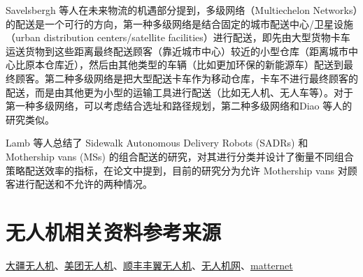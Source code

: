 \documentclass[fontset=none]{ctexart}
\begin{document}
Savelsbergh 等人\cite{savelsbergh50thAnniversaryInvited2016}在未来物流的机遇部分提到，多级网络（Multiechelon Networks）的配送是一个可行的方向，第一种多级网络是结合固定的城市配送中心/卫星设施（urban distribution centers/satellite facilities）进行配送，即先由大型货物卡车运送货物到这些距离最终配送顾客（靠近城市中心）较近的小型仓库（距离城市中心比原本仓库近），然后由其他类型的车辆（比如更加环保的新能源车）配送到最终顾客。第二种多级网络是把大型配送卡车作为移动仓库，卡车不进行最终顾客的配送，而是由其他更为小型的运输工具进行配送（比如无人机、无人车等）。对于第一种多级网络，可以考虑结合选址和路径规划，第二种多级网络和Diao 等人\cite{diaoMultidepotRoutingProblem2024}的研究类似。

Lamb 等人\cite{lambPlanningOptimisedLocal2025}总结了 Sidewalk Autonomous Delivery Robots (SADRs) 和 Mothership vans (MSs) 的组合配送的研究，对其进行分类并设计了衡量不同组合策略配送效率的指标，在论文中提到，目前的研究分为允许 Mothership vans 对顾客进行配送和不允许的两种情况。



\appendix

\section{无人机相关资料参考来源}

\href{https://www.dji.com/cn/flycart-30}{大疆无人机}、\href{https://www.meituan.com/news/NN25032008100109X}{美团无人机}、\href{https://www.fyuav.cn/}{顺丰丰翼无人机}、\href{https://www.youuav.com/}{无人机网}、\href{https://www.matternet.com/}{matternet}
\end{document}
